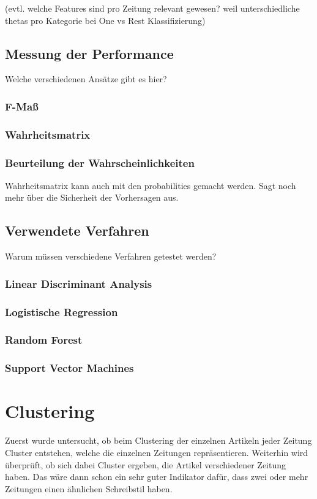 (evtl. welche Features sind pro Zeitung relevant gewesen? weil unterschiedliche thetas pro Kategorie bei One vs Rest Klassifizierung)
\subsection{Messung der Performance}
Welche verschiedenen Ansätze gibt es hier?
\subsubsection*{F-Maß}
\subsubsection*{Wahrheitsmatrix}
\subsubsection*{Beurteilung der Wahrscheinlichkeiten}
Wahrheitsmatrix kann auch mit den probabilities gemacht werden. Sagt noch mehr über die Sicherheit der Vorhersagen aus.
\subsection{Verwendete Verfahren}
Warum müssen verschiedene Verfahren getestet werden?
\subsubsection*{Linear Discriminant Analysis}
\subsubsection*{Logistische Regression}
\subsubsection*{Random Forest}
\subsubsection*{Support Vector Machines}
\section{Clustering}
Zuerst wurde untersucht, ob beim Clustering der einzelnen Artikeln jeder Zeitung Cluster entstehen, welche die einzelnen Zeitungen repräsentieren. Weiterhin wird überprüft, ob sich dabei Cluster ergeben, die Artikel verschiedener Zeitung haben. Das wäre dann schon ein sehr guter Indikator dafür, dass zwei oder mehr Zeitungen einen ähnlichen Schreibstil haben.

